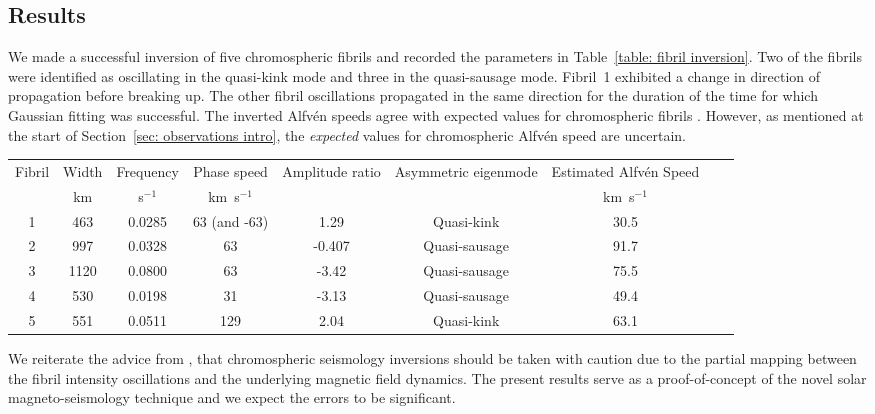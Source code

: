 \documentclass[12pt]{../style-files/ociamthesis}
\begin{document}
\subsection{Results}\label{sec:sms results}
We made a successful inversion of five chromospheric fibrils and recorded the parameters in Table~\ref{table: fibril inversion}. Two of the fibrils were identified as oscillating in the quasi-kink mode and three in the quasi-sausage mode. Fibril~1 exhibited a change in direction of propagation before breaking up. The other fibril oscillations propagated in the same direction for the duration of the time for which Gaussian fitting was successful. The inverted Alfv\'{e}n speeds agree with expected values for chromospheric fibrils \citep{mor12}. However, as mentioned at the start of Section~\ref{sec: observations intro}, the \textit{expected} values for chromospheric Alfv\'{e}n speed are uncertain.

\begin{sidewaystable}
	\centering
	\caption{A table of measured parameters, identified mode, and estimated local Alfv\'{e}n speed of five chromospheric fibrils.}
	\begin{tabular}{ccccccccc}
		\toprule
		Fibril & Width & Frequency & Phase speed & Amplitude ratio & Asymmetric eigenmode & Estimated Alfv\'{e}n Speed \\
		& km & s$^{-1}$ & km~s$^{-1}$ & & & km~s$^{-1}$ \\
		\midrule
		1 & 463 & 0.0285 & 63 (and -63) & 1.29 & Quasi-kink & 30.5 \\
		2 & 997 & 0.0328 & 63 & -0.407 & Quasi-sausage & 91.7 \\
		3 & 1120 & 0.0800 & 63 & -3.42 & Quasi-sausage & 75.5 \\
		4 & 530 & 0.0198 & 31 & -3.13 & Quasi-sausage & 49.4 \\
		5 & 551 & 0.0511 & 129 & 2.04 & Quasi-kink & 63.1 \\
		\bottomrule
	\end{tabular} \label{table: fibril inversion}
\end{sidewaystable}

We reiterate the advice from \citealp{lee_etal15}, that chromospheric seismology inversions should be taken with caution due to the partial mapping between the fibril intensity oscillations and the underlying magnetic field dynamics. The present results serve as a proof-of-concept of the novel solar magneto-seismology technique and we expect the errors to be significant.



  
\end{document}
